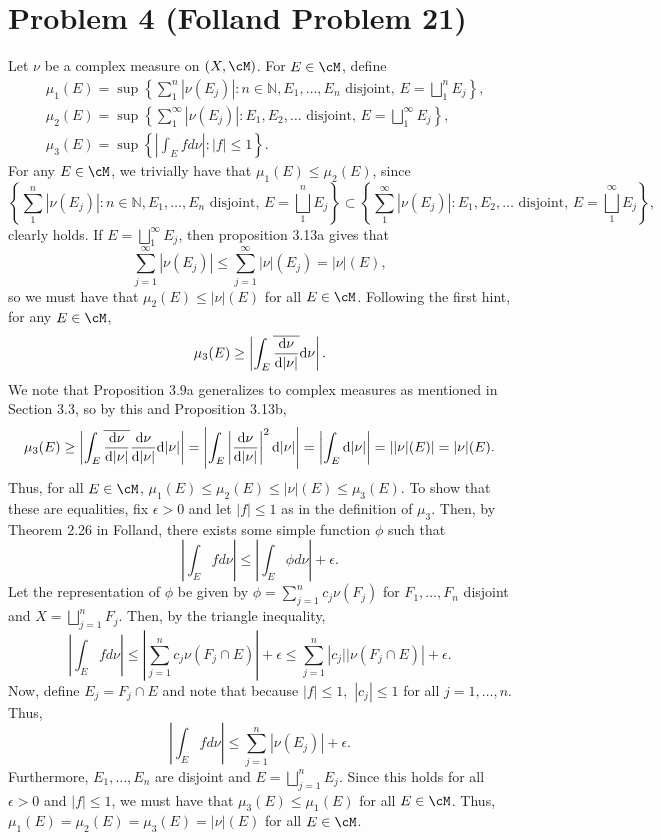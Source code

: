 \documentclass{article}
\begin{document}
\section{Problem 4 (Folland Problem 21)}
Let $\nu$ be a complex measure on $(X,\cM)$. For $E\in\cM$, define
\begin{equation*}
	\begin{aligned}
		& \mu_1(E)=\sup \left\{\sum_1^n\left|\nu\left(E_j\right)\right|: n \in \mathbb{N}, E_1, \ldots, E_n \text { disjoint, } E=\bigsqcup_1^n E_j\right\}, \\
		& \mu_2(E)=\sup \left\{\sum_1^{\infty}\left|\nu\left(E_j\right)\right|: E_1, E_2, \ldots \text { disjoint, } E=\bigsqcup_1^{\infty} E_j\right\}, \\
		& \mu_3(E)=\sup \left\{\left|\int_E f d \nu\right|:|f| \leq 1\right\} .
	\end{aligned}
\end{equation*}
For any $E\in\cM$, we trivially have that $\mu_1(E)\leq\mu_2(E)$, since
\[
\left\{\sum_1^n\left|\nu\left(E_j\right)\right|: n \in \mathbb{N}, E_1, \ldots, E_n \text { disjoint, } E=\bigsqcup_1^n E_j\right\}\subset\left\{\sum_1^{\infty}\left|\nu\left(E_j\right)\right|: E_1, E_2, \ldots \text { disjoint, } E=\bigsqcup_1^{\infty} E_j\right\},
\]
clearly holds. If $E=\bigsqcup_1^{\infty} E_j$, then proposition 3.13a gives that
\[
\sum_{j=1}^{\infty}\left|\nu\left(E_j\right)\right|\leq\sum_{j=1}^\infty |\nu|(E_j)=|\nu|(E),
\]
so we must have that $\mu_2(E)\leq|\nu|(E)$ for all $E\in\cM$. Following the first hint, for any $E\in\cM$,
\[
\mu_3(E)\geq\left|\int_E\overline{\frac{\mathrm{d} \nu}{\mathrm{d}|\nu|}}\mathrm{d}\nu\right|.
\]
We note that Proposition 3.9a generalizes to complex measures as mentioned in Section 3.3, so by this and Proposition 3.13b,
\[
\mu_3(E)\geq\left|\int_E\overline{\frac{\mathrm{d} \nu}{\mathrm{d}|\nu|}}\frac{\mathrm{d} \nu}{\mathrm{d}|\nu|}\mathrm{d}|\nu|\right|=\left|\int_E\left|\frac{\mathrm{d} \nu}{\mathrm{d}|\nu|}\right|^2\mathrm{d}|\nu|\right|=\left|\int_E\mathrm{d}|\nu|\right|=\left||\nu|(E)\right|=|\nu|(E).
\]
Thus, for all $E\in\cM$, $\mu_1(E)\leq\mu_2(E)\leq|\nu|(E)\leq\mu_3(E)$. To show that these are equalities, fix $\epsilon>0$ and let $|f|\leq1$ as in the definition of $\mu_3$. Then, by Theorem 2.26 in Folland, there exists some simple function $\phi$ such that
\[
\left|\int_E f d \nu\right|\leq\left|\int_E \phi d \nu\right|+\epsilon.
\]
Let the representation of $\phi$ be given by $\phi=\sum_{j=1}^nc_j\nu(F_j)$ for $F_1,\ldots,F_n$ disjoint and $X=\bigsqcup_{j=1}^n F_j$. Then, by the triangle inequality,
\[
\left|\int_E f d \nu\right|\leq\left|\sum_{j=1}^nc_j\nu(F_j\cap E)\right|+\epsilon\leq\sum_{j=1}^n\left|c_j||\nu(F_j\cap E)\right|+\epsilon.
\]
Now, define $E_j=F_j\cap E$ and note that because $|f|\leq1,$ $|c_j|\leq1$ for all $j=1,\ldots,n$. Thus,
\[
\left|\int_E f d \nu\right|\leq\sum_{j=1}^n\left|\nu(E_j)\right|+\epsilon.
\]
Furthermore, $E_1,\ldots,E_n$ are disjoint and $E=\bigsqcup_{j=1}^n E_j$. Since this holds for all $\epsilon>0$ and $|f|\leq1$, we must have that $\mu_3(E)\leq\mu_1(E)$ for all $E\in\cM$. Thus, $\mu_1(E)=\mu_2(E)=\mu_3(E)=|\nu|(E)$ for all $E\in\cM$.
\end{document}
